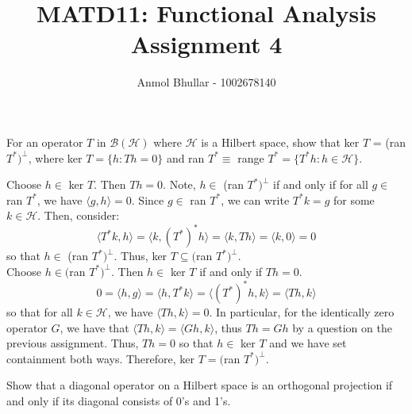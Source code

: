 \documentclass{article}
\title{MATD11: Functional Analysis\\
    Assignment 4}
\author{Anmol Bhullar - 1002678140}
\begin{document}
    \maketitle

    \begin{Exercise}
        For an operator $T$ in $\mathscr{B}(\mathscr{H})$ where $\mathscr{H}$ is a Hilbert space, show that ker $T$ = (ran $T^*)^{\perp}$, where
        ker $T = \{h:Th=0\}$ and ran $T^* \equiv$ range $T^* = \{T^*h: h\in\mathscr{H}\}$. 
    \end{Exercise}

    \begin{Answer}
        Choose $h\in$ ker $T$. Then $Th = 0$. Note, $h\in$ (ran $T^*)^{\perp}$ if and only if for all $g\in$ ran $T^*$, we have $\langle g, h\rangle = 0$.
        Since $g\in$ ran $T^*$, we can write $T^* k = g$ for some $k\in\mathscr{H}$. Then, consider:
        \[ \langle T^* k, h\rangle = \langle k, (T^*)^* h\rangle = \langle k, Th\rangle = \langle k,0\rangle = 0\]
        so that $h\in$ (ran $T^*)^{\perp}$. Thus, ker $T \subseteq ($ran $T^*)^{\perp}$.\\

        Choose $h\in ($ran $T^*)^{\perp}$. Then $h\in$ ker $T$ if and only if $Th=0$.
        \[ 0 = \langle h, g\rangle = \langle h, T^* k\rangle = \langle (T^*)^* h, k\rangle = \langle Th, k\rangle \]
        so that for all $k\in\mathscr{H}$, we have $\langle Th, k\rangle = 0$. In particular, for the identically zero operator $G$, we have that
        $\langle Th, k\rangle = \langle Gh, k\rangle$, thus $Th = Gh$ by a question on the previous assignment. Thus, $Th = 0$ so that $h\in$ ker $T$ and we
        have set containment both ways. Therefore, ker $T = ($ran $T^*)^{\perp}$.
    \end{Answer}

    \newpage
    \begin{Exercise}
        Show that a diagonal operator on a Hilbert space is an orthogonal projection if and only if its diagonal consists of 0's and 1's.
    \end{Exercise}
\end{document}
